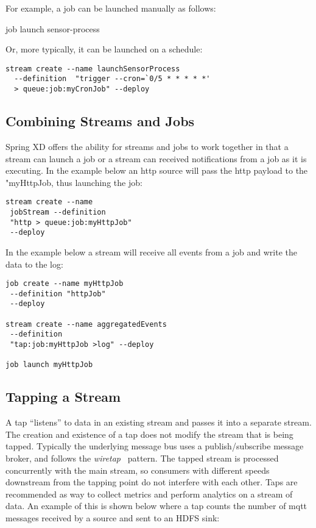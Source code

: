 For example, a job can be launched manually as follows:

job launch sensor-process

Or, more typically, it can be launched on a schedule:

\begin{lstlisting}
stream create --name launchSensorProcess
  --definition  "trigger --cron=`0/5 * * * * *'
  > queue:job:myCronJob" --deploy
\end{lstlisting}

\subsection {Combining Streams and Jobs}

Spring XD offers the ability for streams and jobs to work together in that
a stream can launch a job or a stream can received notifications from a job
as it is executing.  In the example below an http source will pass the http
payload to the "myHttpJob, thus launching the job:

\begin{lstlisting}
stream create --name
 jobStream --definition
 "http > queue:job:myHttpJob"
 --deploy
\end{lstlisting}

In the example below a stream will receive all events from a job and write
the data to the log:

\begin{lstlisting}
job create --name myHttpJob
 --definition "httpJob"
 --deploy

stream create --name aggregatedEvents
 --definition
 "tap:job:myHttpJob >log" --deploy

job launch myHttpJob
\end{lstlisting}

\subsection {Tapping a Stream} \label{sssec:deploytap}

A tap ``listens'' to data in an existing stream and passes it into a separate
stream. The creation and existence of a tap does not modify the stream that
is being tapped. Typically the underlying message bus uses a publish/subscribe
message broker, and follows the \emph{wiretap}~\cite{wiretap}
pattern. The tapped stream is processed concurrently with the main stream, so
 consumers with different speeds downstream from the tapping point do not
 interfere with each other. Taps are recommended as way to collect metrics and perform
analytics on a stream of data. An example of this is shown below where a
tap counts the number of mqtt messages received by a source and sent to an
HDFS sink:

